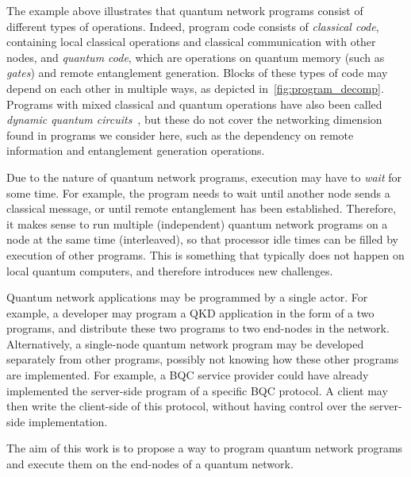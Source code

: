 The example above illustrates that quantum network programs consist of different
types of operations.
Indeed, program code consists of \textit{classical code}, containing local classical operations and classical communication with other nodes, and \textit{quantum code}, which are operations on quantum memory (such as \textit{gates}) and remote entanglement generation.
Blocks of these types of code may depend on each other in multiple ways, as depicted in~\cref{fig:program_decomp}.
Programs with mixed classical and quantum operations have also been called \textit{dynamic quantum circuits}~\cite{cross2021openqasm, burgholzer2021towards}, but these do not cover the networking dimension found in programs we consider here, such as the dependency on remote information and entanglement generation operations.

Due to the nature of quantum network programs, execution may have to \textit{wait} for some time. For example, the program needs to wait until another node sends a classical message, or until remote entanglement has been established.
Therefore, it makes sense to run multiple (independent) quantum network programs on a node at the same time (interleaved), so that processor idle times can be filled by execution of other programs. This is something that typically does not happen on local quantum computers, and therefore introduces new challenges.

Quantum network applications may be programmed by a single actor.
For example, a developer may program a QKD application in the form of a two programs, and distribute these two programs to two end-nodes in the network.
Alternatively, a single-node quantum network program may be developed separately from other programs, possibly not knowing how these other programs are implemented.
For example, a BQC service provider could have already implemented the server-side program of a specific BQC protocol.
A client may then write the client-side of this protocol, without having control over the server-side implementation.

The aim of this work is to propose a way to program quantum network programs and execute them on the end-nodes of a quantum network.


